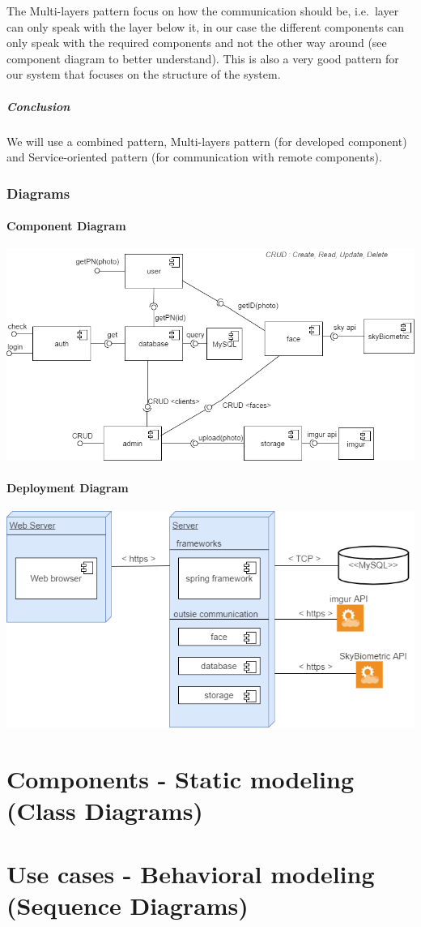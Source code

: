 \documentclass[a4paper,11pt]{article}
\begin{document}
The Multi-layers pattern focus on how the communication should be,
i.e.~layer can only speak with the layer below it, in our case the
different components can only speak with the required components and not
the other way around (see component diagram to better understand). This
is also a very good pattern for our system that focuses on the structure
of the system.

\subparagraph{Conclusion}\label{conclusion}

We will use a combined pattern, Multi-layers pattern (for developed
component) and Service-oriented pattern (for communication with remote
components).

\subsubsection{Diagrams}\label{diagrams}

\paragraph{Component Diagram}\label{component-diagram}

\includegraphics{Architecture/ComponentDiagram.png}

\paragraph{Deployment Diagram}\label{deployment-diagram}

\includegraphics{Architecture/DeploymentDiagram.png}

\section{Components - Static modeling (Class Diagrams)}

\section{Use cases - Behavioral modeling (Sequence Diagrams)}
\end{document}
